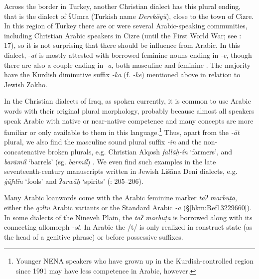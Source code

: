 \documentclass[output=paper]{langsci/langscibook}
\begin{document}
Across the border in Turkey, another Christian dialect has this plural ending, that is the dialect of ʕUmra (Turkish name \textit{Dereköyü}), close to the town of Cizre. In this region of Turkey there are or were several Arabic-speaking communities, including Christian Arabic speakers in Cizre (until the First World War; see \citealt{Jastrow1978}: 17), so it is not surprising that there should be influence from Arabic. In this dialect, \nobreakdash-\textit{at} is mostly attested with borrowed feminine nouns ending in \textit{\nobreakdash-e}, though there are also a couple ending in \nobreakdash-\textit{a}, both masculine and feminine \citep[114]{Hobrack2000}. The majority have the Kurdish diminutive suffix \textit{\nobreakdash-ka} (f. \textit{\nobreakdash-ke}) mentioned above in relation to Jewish Zakho.

In the Christian dialects of Iraq, as spoken currently, it is common to use Arabic words with their original plural morphology, probably because almost all speakers speak Arabic with native or near-native competence and many concepts are more familiar or only available to them in this language.\footnote{Younger NENA speakers who have grown up in the Kurdish-controlled region since 1991 may have less competence in Arabic, however.} Thus, apart from the \textit{\nobreakdash-āt} plural, we also find the masculine sound plural suffix \textit{{}-in} and the non-concatenative broken plurals, e.g. Christian Alqosh \textit{fallāḥ\nobreakdash-ín} ‘farmers’, and \textit{barāmíl} ‘barrels’ (sg. \textit{barmíl}) \citep[273]{Coghill2004}. We even find such examples in the late seventeenth-century manuscripts written in Jewish Lišāna Deni dialects, e.g. \textit{\.gāfılīn} ‘fools’ and \textit{ʔarwāḥ} ‘spirits’ (\citealt{Sabar1984}: 205–206).

Many Arabic loanwords come with the Arabic feminine marker \textit{tāʔ} \textit{marbūṭa}, either the \textit{qəltu} Arabic variants or the Standard Arabic \textit{\nobreakdash-a} (§\ref{bkm:Ref13229660}). In some dialects of the Nineveh Plain, the \textit{tāʔ} \textit{marbūṭa} is borrowed along with its connecting allomorph \textit{{}-ət}. In Arabic the /t/ is only realized in construct state (as the head of a genitive phrase) or before possessive suffixes.
\end{document}

